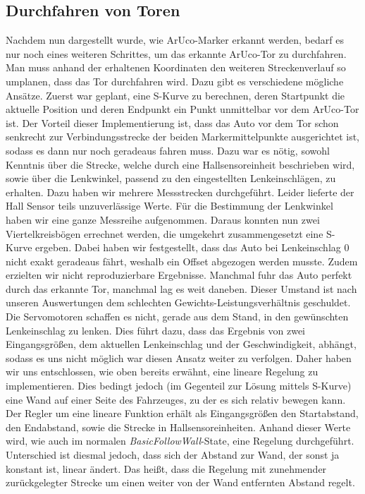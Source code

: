 \subsection{Durchfahren von Toren}
Nachdem nun dargestellt wurde, wie ArUco-Marker erkannt werden, bedarf es nur noch eines weiteren Schrittes, um das erkannte ArUco-Tor zu durchfahren. Man muss anhand der erhaltenen Koordinaten den weiteren Streckenverlauf so umplanen, dass das Tor durchfahren wird. 
\newline
Dazu gibt es verschiedene mögliche Ansätze. Zuerst war geplant, eine S-Kurve zu berechnen, deren Startpunkt die aktuelle Position und deren Endpunkt ein Punkt unmittelbar vor dem ArUco-Tor ist. Der Vorteil dieser Implementierung ist, dass das Auto vor dem Tor schon senkrecht zur Verbindungsstrecke der beiden Markermittelpunkte ausgerichtet ist, sodass es dann nur noch geradeaus fahren muss. Dazu war es nötig, sowohl Kenntnis über die Strecke, welche durch eine Hallsensoreinheit beschrieben wird, sowie über die Lenkwinkel, passend zu den eingestellten Lenkeinschlägen, zu erhalten. Dazu haben wir mehrere Messstrecken durchgeführt. Leider lieferte der Hall Sensor teils unzuverlässige Werte. Für die Bestimmung der Lenkwinkel haben wir eine ganze Messreihe aufgenommen. Daraus konnten nun zwei Viertelkreisbögen errechnet werden, die umgekehrt zusammengesetzt eine S-Kurve ergeben. Dabei haben wir festgestellt, dass das Auto bei Lenkeinschlag 0 nicht exakt geradeaus fährt, weshalb ein Offset abgezogen werden musste. Zudem erzielten wir nicht reproduzierbare Ergebnisse. Manchmal fuhr das Auto perfekt durch das erkannte Tor, manchmal lag es weit daneben. Dieser Umstand ist nach unseren Auswertungen dem schlechten Gewichts-Leistungsverhältnis geschuldet. Die Servomotoren schaffen es nicht, gerade aus dem Stand, in den gewünschten Lenkeinschlag zu lenken. Dies führt dazu, dass das Ergebnis von zwei Eingangsgrößen, dem aktuellen Lenkeinschlag und der Geschwindigkeit, abhängt, sodass es uns nicht möglich war diesen Ansatz weiter zu verfolgen. 
\newline
\newline
Daher haben wir uns entschlossen, wie oben bereits erwähnt, eine lineare Regelung zu implementieren. Dies bedingt jedoch (im Gegenteil zur Lösung mittels S-Kurve) eine Wand auf einer Seite des Fahrzeuges, zu der es sich relativ bewegen kann. 
\newline
\newline
Der Regler um eine lineare Funktion erhält als Eingangsgrößen den Startabstand, den Endabstand, sowie die Strecke in Hallsensoreinheiten. Anhand dieser Werte wird, wie auch im normalen \textit{BasicFollowWall}-State, eine Regelung durchgeführt. Unterschied ist diesmal jedoch, dass sich der Abstand zur Wand, der sonst ja konstant ist, linear ändert. Das heißt, dass die Regelung mit zunehmender zurückgelegter Strecke um einen weiter von der Wand entfernten Abstand regelt. 
